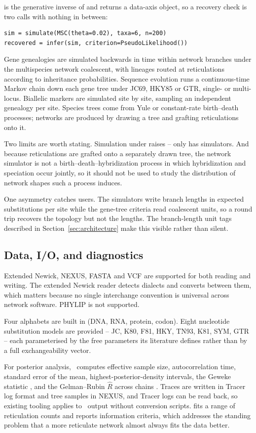  is the generative inverse of  and returns a
data-axis object, so a recovery check is two calls with nothing in between:

\begin{lstlisting}
sim = simulate(MSC(theta=0.02), taxa=6, n=200)
recovered = infer(sim, criterion=PseudoLikelihood())
\end{lstlisting}

Gene genealogies are simulated backwards in time within network branches under
the multispecies network coalescent, with lineages routed at reticulations
according to inheritance probabilities. Sequence evolution runs a continuous-time
Markov chain down each gene tree under JC69, HKY85 or GTR, single- or
multi-locus. Biallelic markers are simulated site by site, sampling an
independent genealogy per site. Species trees come from Yule or constant-rate
birth--death processes; networks are produced by drawing a tree and grafting
reticulations onto it.

Two limits are worth stating. Simulation under  raises
 -- only  has simulators. And because
reticulations are grafted onto a separately drawn tree, the network simulator
is not a birth--death--hybridization process in which hybridization and
speciation occur jointly, so it should not be used to study the distribution of
network shapes such a process induces.

One asymmetry catches users. The simulators write branch lengths in expected
substitutions per site while the gene-tree criteria read coalescent units, so a
round trip recovers the topology but not the lengths. The branch-length unit
tags described in Section~\ref{sec:architecture} make this visible rather than
silent.

\subsection{Data, I/O, and diagnostics}

Extended Newick, NEXUS, FASTA and VCF are supported for both reading and
writing. The extended Newick reader detects dialects and converts between them,
which matters because no single interchange convention is universal across
network software. PHYLIP is not supported.

Four alphabets are built in (DNA, RNA, protein, codon). Eight nucleotide
substitution models are provided -- JC, K80, F81, HKY, TN93, K81, SYM, GTR --
each parameterised by the free parameters its literature defines rather than by
a full exchangeability vector.

For posterior analysis, \phynetpy\ computes effective sample size,
autocorrelation time, standard error of the mean, highest-posterior-density
intervals, the Geweke statistic \cite{Geweke1992}, and the Gelman--Rubin
$\hat{R}$ across chains \cite{GelmanRubin1992}. Traces are written in Tracer
log format \cite{Rambaut2018Tracer} and tree samples in NEXUS, and Tracer logs
can be read back, so existing tooling applies to \phynetpy\ output without
conversion scripts.  fits a range of reticulation
counts and reports information criteria, which addresses the standing problem
that a more reticulate network almost always fits the data better.
